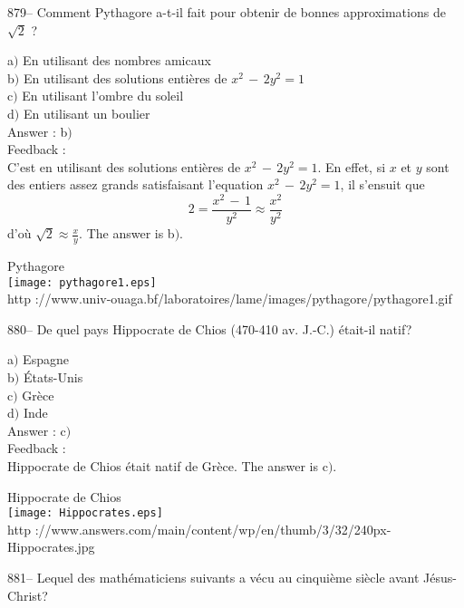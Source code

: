 \documentclass[letterpaper, 12pt]{article}
\begin{document}
879-- Comment Pythagore a-t-il fait pour obtenir de bonnes
approximations de $\sqrt2$ ?

a$)$ En utilisant des nombres amicaux \\
b$)$ En utilisant des solutions enti\`eres de $x^2\,-\,2y^2=1$ \\
c$)$ En utilisant l'ombre du soleil \\
d$)$ En utilisant un boulier\\

Answer : b$)$\\

Feedback : \\
C'est en utilisant des solutions enti\`eres de $x^2\,-\,2y^2=1$. En
effet, si $x$ et $y$ sont des entiers assez grands satisfaisant
l'equation $x^2\,-\,2y^2=1$, il s'ensuit que
$$2=\displaystyle{\frac{x^2\,-\,1}{y^2}\approx\frac{x^2}{y^2}}$$
d'o\`u $\sqrt2\approx\frac xy$. The answer is b$)$.\\

        \begin{center}
        Pythagore\\
    \texttt{[image: pythagore1.eps]}\\
        {\footnotesize http
://www.univ-ouaga.bf/laboratoires/lame/images/pythagore/pythagore1.gif}
    \end{center}

880-- De quel pays Hippocrate de Chios (470-410 av. J.-C.)
\'etait-il natif?

a$)$ Espagne \\
b$)$ \'Etats-Unis \\
c$)$ Gr\`ece \\
d$)$ Inde\\

Answer : c$)$\\

Feedback : \\
Hippocrate de Chios \'etait natif de Gr\`ece. The answer is c$)$.\\

        \begin{center}
        Hippocrate de Chios\\
    \texttt{[image: Hippocrates.eps]}\\
        {\footnotesize http
://www.answers.com/main/content/wp/en/thumb/3/32/240px-Hippocrates.jpg}
    \end{center}

881-- Lequel des math\'ematiciens suivants a v\'ecu au cinqui\`eme
si\`ecle avant J\'esus-Christ?
\end{document}
